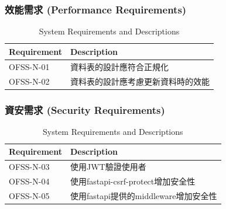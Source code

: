 \documentclass[a4paper, 12pt]{article}
\begin{document}
\subsubsection{效能需求 (Performance Requirements)}
\begin{table}[h]
    \centering
    \renewcommand{\arraystretch}{1.35}
    \begin{tabular}{|p{3cm}|p{10cm}|}
        \hline
        \textbf{Requirement} & \textbf{Description} \\
        \hline
        OFSS-N-01 & 資料表的設計應符合正規化\\
        \hline
        OFSS-N-02 & 資料表的設計應考慮更新資料時的效能 \\
        \hline
        
    \end{tabular}
    \caption{System Requirements and Descriptions}
    \label{tab:system-requirements}
\end{table}


\subsubsection{資安需求 (Security Requirements)}
\begin{table}[h]
    \centering
    \renewcommand{\arraystretch}{1.35}
    \begin{tabular}{|p{3cm}|p{10cm}|}
        \hline
        \textbf{Requirement} & \textbf{Description} \\
        \hline
        OFSS-N-03 & 使用JWT驗證使用者 \\
        \hline
        OFSS-N-04 & 使用fastapi-csrf-protect增加安全性 \\
        \hline
        OFSS-N-05 & 使用fastapi提供的middleware增加安全性\\
        \hline
        
    \end{tabular}
    \caption{System Requirements and Descriptions}
    \label{tab:system-requirements}
\end{table}
\end{document}
